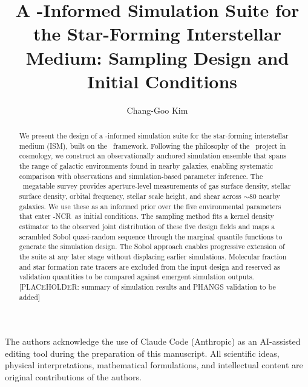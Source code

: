 \documentclass[twocolumn,twocolappendix,linenumbers]{aastex702}
\begin{document}
\title{A \PHANGS-Informed Simulation Suite for the Star-Forming Interstellar Medium:
       Sampling Design and \TIGRESS\ Initial Conditions}

\author[0000-0003-2896-3725]{Chang-Goo Kim}


\begin{abstract}
We present the design of a \PHANGS-informed simulation suite for the star-forming
interstellar medium (ISM), built on the \TIGRESS\ framework. Following the philosophy
of the \CAMELS\ project in cosmology, we construct an observationally anchored
simulation ensemble that spans the range of galactic environments found in nearby
galaxies, enabling systematic comparison with observations and simulation-based
parameter inference. The \PHANGS\ megatable survey provides aperture-level measurements
of gas surface density, stellar surface density, orbital frequency, stellar scale height,
and shear across $\sim$80 nearby galaxies. We use these as an informed prior over the
five environmental parameters that enter \TIGRESS-NCR\ as initial conditions.
The sampling method fits a kernel density estimator to the observed joint distribution
of these five design fields and maps a scrambled Sobol quasi-random sequence through
the marginal quantile functions to generate the simulation design. The Sobol approach
enables progressive extension of the suite at any later stage without displacing earlier
simulations. Molecular fraction and star formation rate tracers are excluded from the
input design and reserved as validation quantities to be compared against emergent
simulation outputs.
[PLACEHOLDER: summary of simulation results and PHANGS validation to be added]
\end{abstract}









\begin{acknowledgments}
The authors acknowledge the use of Claude Code (Anthropic) as an AI-assisted
editing tool during the preparation of this manuscript. All scientific ideas,
physical interpretations, mathematical formulations, and intellectual content
are original contributions of the authors.
\end{acknowledgments}



\end{document}
